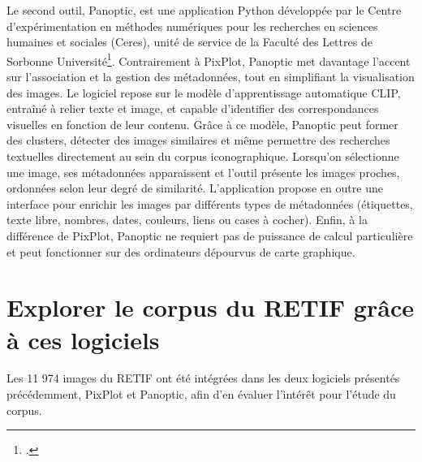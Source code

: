 Le second outil, Panoptic, est une application Python développée par le Centre d’expérimentation en méthodes numériques pour les recherches en sciences humaines et sociales (Ceres), unité de service de la Faculté des Lettres de Sorbonne Université\footcite{boutePANOPTICOutilDexploration2024}. Contrairement à PixPlot, Panoptic met davantage l’accent sur l’association et la gestion des métadonnées, tout en simplifiant la visualisation des images. Le logiciel repose sur le modèle d’apprentissage automatique CLIP, entraîné à relier texte et image, et capable d’identifier des correspondances visuelles en fonction de leur contenu. Grâce à ce modèle, Panoptic peut former des clusters, détecter des images similaires et même permettre des recherches textuelles directement au sein du corpus iconographique. Lorsqu’on sélectionne une image, ses métadonnées apparaissent et l’outil présente les images proches, ordonnées selon leur degré de similarité. L’application propose en outre une interface pour enrichir les images par différents types de métadonnées (étiquettes, texte libre, nombres, dates, couleurs, liens ou cases à cocher). Enfin, à la différence de PixPlot, Panoptic ne requiert pas de puissance de calcul particulière et peut fonctionner sur des ordinateurs dépourvus de carte graphique.

\section[Exploration du RETIF]{Explorer le corpus du RETIF grâce à ces logiciels}
	
Les 11 974 images du RETIF ont été intégrées dans les deux logiciels présentés précédemment, PixPlot et Panoptic, afin d’en évaluer l’intérêt pour l’étude du corpus.

